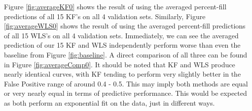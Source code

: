 Figure \ref{fig:averageKF0} shows the result of using the averaged percent-fill predictions of all 15 KF's on all 4 validation sets. Similarly, Figure \ref{fig:averageWLS0} shows the result of using the averaged percent-fill predictions of all 15 WLS's on all 4 validation sets. Immediately, we can see the averaged prediction of our 15 KF and WLS independently perform worse than even the baseline from Figure \ref{fig:baseline}. A direct comparison of all three can be found in Figure \ref{fig:averageComp0}. It should be noted that KF and WLS produce nearly identical curves, with KF tending to perform very slightly better in the False Positive range of around 0.4 - 0.5. This may imply both methods are equal or very nearly equal in terms of predictive performance. This would be expected as both perform an exponential fit on the data, just in different ways.

\pagebreak

